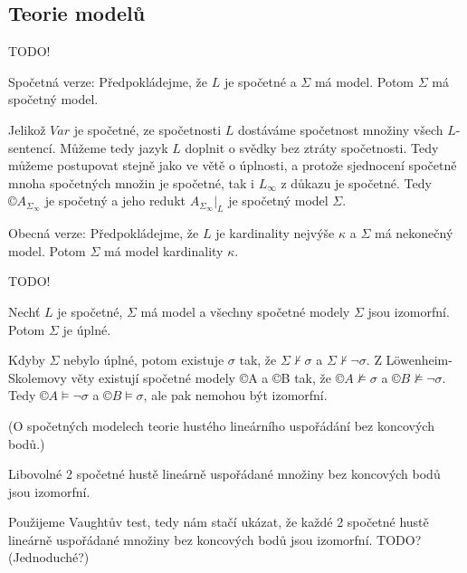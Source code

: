\documentclass[12pt]{article}                   %
\begin{document}
    \subsection{Teorie modelů}
        \begin{tvrzeni}
            TODO!
        \end{tvrzeni}

        \begin{veta}
            Spočetná verze: Předpokládejme, že $L$ je spočetné a $\Sigma$ má model. Potom $\Sigma$ má spočetný model.

            \begin{dukazin}
                Jelikož $Var$ je spočetné, ze spočetnosti $L$ dostáváme spočetnost množiny všech $L$-sentencí. Můžeme tedy jazyk $L$ doplnit o svědky bez ztráty spočetnosti. Tedy můžeme postupovat stejně jako ve větě o úplnosti, a protože sjednocení spočetně mnoha spočetných množin je spočetné, tak i $L_∞$ z důkazu je spočetné. Tedy $©A_{\Sigma_∞}$ je spočetný a jeho redukt $A_{\Sigma_∞} |_L$ je spočetný model $\Sigma$.
            \end{dukazin}

            Obecná verze: Předpokládejme, že $L$ je kardinality nejvýše $\kappa$ a $\Sigma$ má nekonečný model. Potom $\Sigma$ má model kardinality $\kappa$.

            \begin{dukazin}
                TODO!
            \end{dukazin}
        \end{veta}

        \begin{tvrzeni}
            Nechť $L$ je spočetné, $\Sigma$ má model a všechny spočetné modely $\Sigma$ jsou izomorfní. Potom $\Sigma$ je úplné.

            \begin{dukazin}
                Kdyby $\Sigma$ nebylo úplné, potom existuje $\sigma$ tak, že $\Sigma \nvdash \sigma$ a $\Sigma \nvdash \neg \sigma$. Z Löwenheim-Skolemovy věty existují spočetné modely ©A a ©B tak, že $©A \not\models \sigma$ a $©B \not\models \neg \sigma$. Tedy $©A \models \neg \sigma$ a $©B \models \sigma$, ale pak nemohou být izomorfní.
            \end{dukazin}
        \end{tvrzeni}

        \begin{veta}[Cantor]
            (O spočetných modelech teorie hustého lineárního uspořádání bez koncových bodů.)

            Libovolné 2 spočetné hustě lineárně uspořádané množiny bez koncových bodů jsou izomorfní.

            \begin{dukazin}
                Použijeme Vaughtův test, tedy nám stačí ukázat, že každé 2 spočetné hustě lineárně uspořádané množiny bez koncových bodů jsou izomorfní. TODO? (Jednoduché?)
            \end{dukazin}
        \end{veta}
\end{document}
